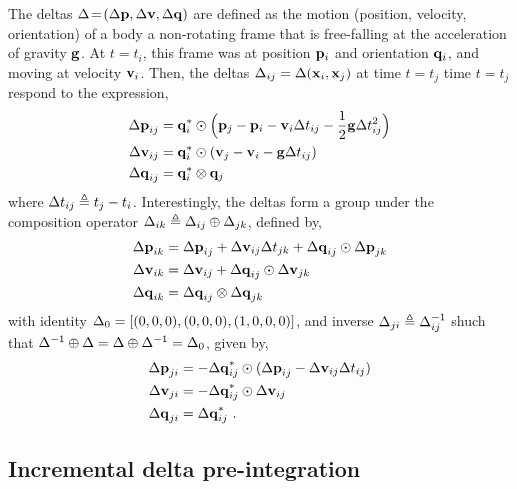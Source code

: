 The deltas $\Delta\!=\!({\Delta{\bf p}},{\Delta{\bf v}},{\Delta{\bf q}})$ are defined as the motion (position, velocity, orientation) of a body \wrt a non-rotating frame that is free-falling at the acceleration of gravity ${\bf g}$. At $t=t_i$, this frame was at position ${\bf p}_i$ and orientation ${\bf q}_i$, and moving at velocity ${\bf v}_i$. Then, the deltas $\Delta_{ij}=\Delta({\bf x}_i,{\bf x}_j)$ at time $t=t_j$ \wrt time $t=t_j$ respond to the expression,
%
\begin{align}\label{equ:delta_definition}
\begin{split}
{\Delta{\bf p}}_{ij} &= {\bf q}_i^*\odot\Big({\bf p}_j - {\bf p}_i - {\bf v}_i\Delta t_{ij} - \frac12{\bf g}\Delta t_{ij}^2\Big) \\
{\Delta{\bf v}}_{ij} &= {\bf q}_i^*\odot({\bf v}_j - {\bf v}_i - {\bf g}\Delta t_{ij}) \\
{\Delta{\bf q}}_{ij} &= {\bf q}_i^*\otimes{\bf q}_j 
\end{split}
\end{align}
%
where $\Delta t_{ij} \triangleq t_j - t_i$. Interestingly, the deltas form a group under the composition operator $\Delta_{ik}\triangleq\Delta_{ij}\oplus\Delta_{jk}$, defined by,
%
\begin{align} \label{equ:g_composition}
\begin{split}
{\Delta{\bf p}}_{ik} 
&= {\Delta{\bf p}}_{ij} + {\Delta{\bf v}}_{ij}\Delta t_{jk} + {\Delta{\bf q}}_{ij}\odot{\Delta{\bf p}}_{jk} \\
{\Delta{\bf v}}_{ik} 
&= {\Delta{\bf v}}_{ij} + {\Delta{\bf q}}_{ij}\odot{\Delta{\bf v}}_{jk} \\
{\Delta{\bf q}}_{ik} 
&= {\Delta{\bf q}}_{ij}\otimes{\Delta{\bf q}}_{jk} 
\end{split}
\end{align}
%
with identity $\Delta_0=[(0,0,0),(0,0,0),(1,0,0,0)]$, and inverse $\Delta_{ji}\triangleq\Delta_{ij}^{-1}$ shuch that $\Delta^{-1}\oplus\Delta=\Delta\oplus\Delta^{-1}=\Delta_0$, given by,
%
\begin{align}
\begin{split}
{\Delta{\bf p}}_{ji} 
&= -{\Delta{\bf q}}_{ij}^*\odot({\Delta{\bf p}}_{ij} - {\Delta{\bf v}}_{ij}\Delta t_{ij}) \\
{\Delta{\bf v}}_{ji} 
&= -{\Delta{\bf q}}_{ij}^*\odot{\Delta{\bf v}}_{ij} \\
{\Delta{\bf q}}_{ji} 
&= {\Delta{\bf q}}_{ij}^*
~.
\end{split}
\end{align}



\subsection{Incremental delta pre-integration}

